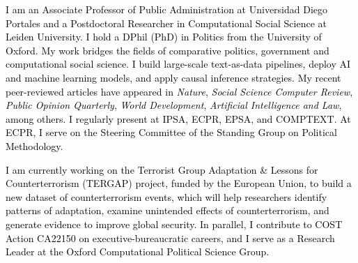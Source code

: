




\vspace{3mm}

\begin{cvparagraph}

\textcolor{black}{I am an Associate Professor of Public Administration at Universidad Diego Portales and a Postdoctoral Researcher in Computational Social Science at Leiden University. I hold a DPhil (PhD) in Politics from the University of Oxford. My work bridges the fields of comparative politics, government and computational social science. I build large-scale text-as-data pipelines, deploy AI and machine learning models, and apply causal inference strategies. My recent peer-reviewed articles have appeared in {\itshape Nature}, {\itshape Social Science Computer Review}, {\itshape Public Opinion Quarterly}, {\itshape World Development}, {\itshape Artificial Intelligence and Law}, among others. I regularly present at IPSA, ECPR, EPSA, and COMPTEXT. At ECPR, I serve on the Steering Committee of the Standing Group on Political Methodology.}

\textcolor{black}{I am currently working on the Terrorist Group Adaptation \& Lessons for Counterterrorism (TERGAP) project, funded by the European Union, to build a new dataset of counterterrorism events, which will help researchers identify patterns of adaptation, examine unintended effects of counterterrorism, and generate evidence to improve global security. In parallel, I contribute to COST Action CA22150 on executive-bureaucratic careers, and I serve as a Research Leader at the Oxford Computational Political Science Group.}
\vspace{1mm}
\end{cvparagraph}
